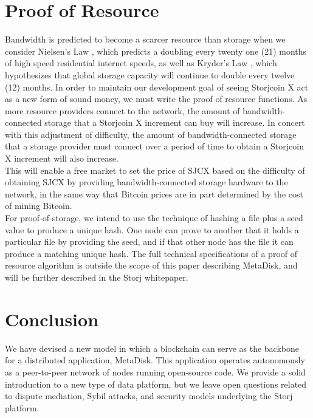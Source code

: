\documentclass[a4paper,10pt]{article}
\begin{document}
\section{Proof of Resource}
Bandwidth is predicted to become a scarcer resource than storage when we consider Nielsen’s Law \cite{15}, which predicts a doubling every twenty one (21) months of high speed residential internet speeds, as well as Kryder’s Law \cite{16}, which hypothesizes that global storage capacity will continue to double every twelve (12) months.  In order to maintain our development goal of seeing Storjcoin X act as a new form of sound money, we must write the proof of resource functions. As more resource providers connect to the network, the amount of bandwidth-connected storage that a Storjcoin X increment can buy will increase.  In concert with this adjustment of difficulty, the amount of bandwidth-connected storage that a storage provider must connect over a period of time to obtain a Storjcoin X increment will also increase.  \\

This will enable a free market to set the price of SJCX based on the difficulty of obtaining SJCX by providing bandwidth-connected storage hardware to the network, in the same way that Bitcoin prices are in part determined by the cost of mining Bitcoin.  \\

For proof-of-storage, we intend to use the technique of hashing a file plus a seed value to produce a unique hash. One node can prove to another that it holds a particular file by providing the seed, and if that other node has the file it can produce a matching unique hash. The full technical specifications of a proof of resource algorithm is outside the scope of this paper describing MetaDisk, and will be further described in the Storj whitepaper.

\section{Conclusion}

We have devised a new model in which a blockchain can serve as the backbone for a distributed application, MetaDisk. This application operates autonomously as a peer-to-peer network of nodes running open-source code. We provide a solid introduction to a new type of data platform, but we leave open questions related to dispute mediation, Sybil attacks, and security models underlying the Storj platform.\\


\begingroup
  \raggedright
  
\endgroup
\end{document}
